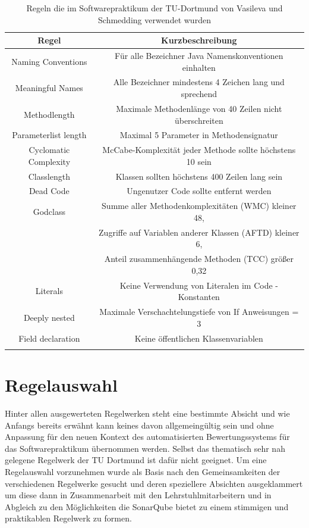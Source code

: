 \documentclass[da,ngerman]{stthesis}
\begin{document}
				\begin{center}
					\tabulinesep=1.5mm
					\begin{longtabu}{|c|c|}
						\hline
  						\textbf{Regel} & \textbf{Kurzbeschreibung}\\
  						\hline
  						Naming Conventions & Für alle Bezeichner Java Namenskonventionen einhalten \\
  						\hline
						Meaningful Names & Alle Bezeichner mindestens 4 Zeichen lang und sprechend \\
						\hline
						Methodlength & Maximale Methodenlänge von 40 Zeilen nicht überschreiten \\
						\hline
						Parameterlist length & Maximal 5 Parameter in Methodensignatur \\
						\hline
						Cyclomatic Complexity & McCabe-Komplexität jeder Methode sollte höchstens 10 sein \\
						\hline
						Classlength & Klassen sollten höchstens 400 Zeilen lang sein \\
						\hline
						Dead Code & Ungenutzer Code sollte entfernt werden \\
						\hline
						Godclass  & Summe aller Methodenkomplexitäten (WMC) kleiner 48, \\ & Zugriffe auf Variablen anderer Klassen (AFTD) kleiner 6, \\ & Anteil zusammenhängende Methoden (TCC) größer 0,32 \\
						\hline
						Literals & Keine Verwendung von Literalen im Code - Konstanten \\
						\hline
						Deeply nested & Maximale Verschachtelungstiefe von If Anweisungen = 3 \\
						\hline
						Field declaration & Keine öffentlichen Klassenvariablen \\
  						\hline
  						\caption{Regeln die im Softwarepraktikum der TU-Dortmund von Vasileva und Schmedding verwendet wurden \cite{ImproveCodeQuality}}
						\label{soprarules}
  					\end{longtabu}   
  				\end{center}
		\section{Regelauswahl}
			Hinter allen ausgewerteten Regelwerken steht eine bestimmte Absicht und wie Anfangs bereits erwähnt kann keines davon allgemeingültig sein und ohne Anpassung für den neuen Kontext des automatisierten Bewertungssystems für das Softwarepraktikum übernommen werden. Selbst das thematisch sehr nah gelegene Regelwerk der TU Dortmund ist dafür nicht geeignet. Um eine Regelauswahl vorzunehmen wurde als Basis nach den Gemeinsamkeiten der verschiedenen Regelwerke gesucht und deren speziellere Absichten ausgeklammert um diese dann in Zusammenarbeit mit den Lehrstuhlmitarbeitern und in Abgleich zu den Möglichkeiten die SonarQube bietet zu einem stimmigen und praktikablen Regelwerk zu formen.
\end{document}
